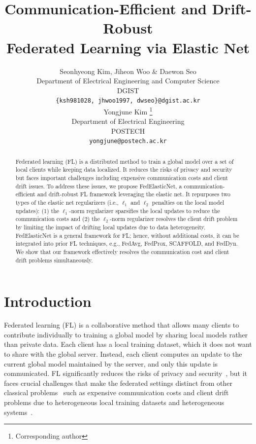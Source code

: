 \documentclass{article} %
\title{Communication-Efficient and Drift-Robust \\ Federated Learning via Elastic Net}
\author{Seonhyeong Kim, Jiheon Woo \& Daewon Seo \\
Department of Electrical Engineering and Computer Science\\
DGIST\\
\texttt{\{ksh981028, jhwoo1997, dwseo\}@dgist.ac.kr} \\
\And
Yongjune Kim \thanks{Corresponding author}  \\
Department of Electrical Engineering \\
POSTECH \\
\texttt{yongjune@postech.ac.kr} \\
}
\begin{document}
\maketitle

\begin{abstract}
Federated learning (FL) is a distributed method to train a global model over a set of local clients while keeping data localized. It reduces the risks of privacy and security but faces important challenges including expensive communication costs and client drift issues. To address these issues, we propose FedElasticNet, a communication-efficient and drift-robust FL framework leveraging the elastic net. It repurposes two types of the elastic net regularizers (i.e., $\ell_1$ and $\ell_2$ penalties on the local model updates): (1) the $\ell_1$-norm regularizer sparsifies the local updates to reduce the communication costs and (2) the $\ell_2$-norm regularizer resolves the client drift problem by limiting the impact of drifting local updates due to data heterogeneity. FedElasticNet is a general framework for FL; hence, without additional costs, it can be integrated into prior FL techniques, e.g., FedAvg, FedProx, SCAFFOLD, and FedDyn. We show that our framework effectively resolves the communication cost and client drift problems simultaneously. 
\end{abstract}

\section{Introduction}

Federated learning (FL) is a collaborative method that allows many clients to contribute individually to training a global model by sharing local models rather than private data. Each client has a local training dataset, which it does not want to share with the global server. Instead, each client computes an update to the current global model maintained by the server, and only this update is communicated. FL significantly reduces the risks of privacy and security~\citep{McMahan2017communication,Li2020federatedlearning}, but it faces crucial challenges that make the federated settings distinct from other classical problems~\citep{Li2020federatedlearning} such as expensive communication costs and client drift problems due to heterogeneous local training datasets and heterogeneous systems~\citep{McMahan2017communication,Li2020federatedlearning,Konevcny2016federated,Konevcny2016federatedlearning}. 
\end{document}
